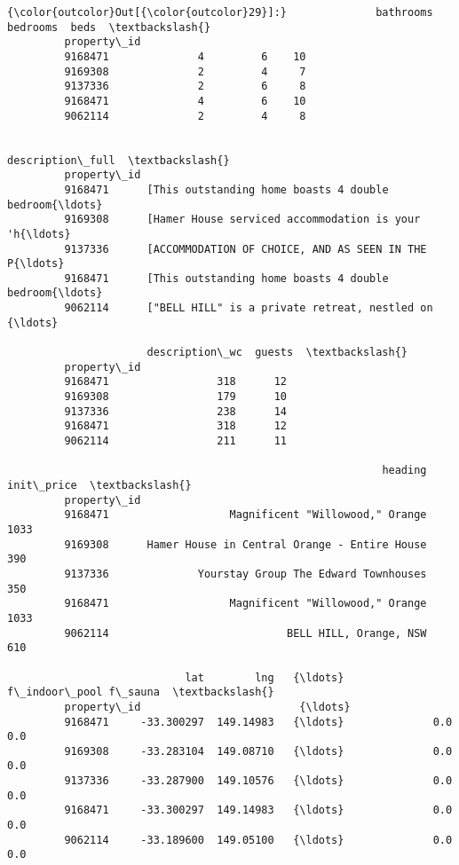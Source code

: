 \documentclass[11pt]{article}
\begin{document}
\begin{Verbatim}[commandchars=\\\{\}]
{\color{outcolor}Out[{\color{outcolor}29}]:}              bathrooms  bedrooms  beds  \textbackslash{}
         property\_id                              
         9168471              4         6    10   
         9169308              2         4     7   
         9137336              2         6     8   
         9168471              4         6    10   
         9062114              2         4     8   
         
                                                       description\_full  \textbackslash{}
         property\_id                                                      
         9168471      [This outstanding home boasts 4 double bedroom{\ldots}   
         9169308      [Hamer House serviced accommodation is your 'h{\ldots}   
         9137336      [ACCOMMODATION OF CHOICE, AND AS SEEN IN THE P{\ldots}   
         9168471      [This outstanding home boasts 4 double bedroom{\ldots}   
         9062114      ["BELL HILL" is a private retreat, nestled on {\ldots}   
         
                      description\_wc  guests  \textbackslash{}
         property\_id                           
         9168471                 318      12   
         9169308                 179      10   
         9137336                 238      14   
         9168471                 318      12   
         9062114                 211      11   
         
                                                           heading  init\_price  \textbackslash{}
         property\_id                                                             
         9168471                   Magnificent "Willowood," Orange        1033   
         9169308      Hamer House in Central Orange - Entire House         390   
         9137336              Yourstay Group The Edward Townhouses         350   
         9168471                   Magnificent "Willowood," Orange        1033   
         9062114                            BELL HILL, Orange, NSW         610   
         
                            lat        lng   {\ldots}    f\_indoor\_pool f\_sauna  \textbackslash{}
         property\_id                         {\ldots}                            
         9168471     -33.300297  149.14983   {\ldots}              0.0     0.0   
         9169308     -33.283104  149.08710   {\ldots}              0.0     0.0   
         9137336     -33.287900  149.10576   {\ldots}              0.0     0.0   
         9168471     -33.300297  149.14983   {\ldots}              0.0     0.0   
         9062114     -33.189600  149.05100   {\ldots}              0.0     0.0   
         

\end{Verbatim}
\end{document}
